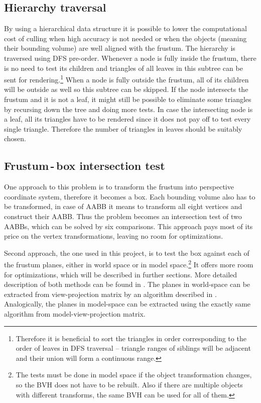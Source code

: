 \documentclass[report,11pt]{elsarticle}
\begin{document}
\subsection{Hierarchy traversal}
By using a hierarchical data structure it is possible to lower the computational cost of culling when high accuracy is not needed or when the objects (meaning their bounding volume) are well aligned with the frustum. The hierarchy is traversed using DFS pre-order. Whenever a node is fully inside the frustum, there is no need to test its children and triangles of all leaves in this subtree can be sent for rendering.\footnote{Therefore it is beneficial to sort the triangles in order corresponding to the order of leaves in DFS traversal -- triangle ranges of siblings will be adjacent and their union will form a continuous range.} When a node is fully outside the frustum, all of its children will be outside as well so this subtree can be skipped. If the node intersects the frustum and it is not a leaf, it might still be possible to eliminate some triangles by recursing down the tree and doing more tests. In case the intersecting node is a leaf, all its triangles have to be rendered since it does not pay off to test every single triangle. Therefore the number of triangles in leaves should be suitably chosen.

\subsection{Frustum\,-\,box intersection test}
One approach to this problem is to transform the frustum into perspective coordinate system, therefore it becomes a box. Each bounding volume also has to be transformed, in case of AABB it means to transform all eight vertices and construct their AABB. Thus the problem becomes an intersection test of two AABBs, which can be solved by six comparisons. This approach pays most of its price on the vertex transformations, leaving no room for optimizations.

Second approach, the one used in this project, is to test the box against each of the frustum planes, either in world space or in model space.\footnote{The tests must be done in model space if the object transformation changes, so the BVH does not have to be rebuilt. Also if there are multiple objects with different transforms, the same BVH can be used for all of them.} It offers more room for optimizations, which will be described in further sections. More detailed description of both methods can be found in \cite{Assarsson}. The planes in world-space can be extracted from view-projection matrix by an algorithm described in \cite{Gribb}. Analogically, the planes in model-space can be extracted using the exactly same algorithm from model-view-projection matrix.
\end{document}

